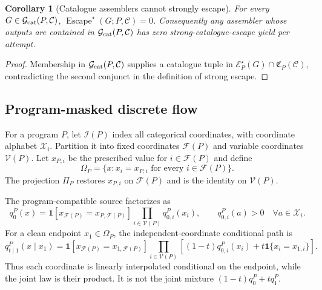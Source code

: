 \documentclass{article}
\newtheorem{corollary}[theorem]{Corollary}
\begin{document}
\begin{corollary}[Catalogue assemblers cannot strongly escape]
For every $G\in\mathcal G_{\rm cat}(P,\mathcal C)$,
$\operatorname{Escape}^\star(G;P,\mathcal C)=0$. Consequently any assembler whose outputs are
contained in $\mathcal G_{\rm cat}(P,\mathcal C)$ has zero strong-catalogue-escape yield per attempt.
\end{corollary}

\begin{proof}
Membership in $\mathcal G_{\rm cat}(P,\mathcal C)$ supplies a catalogue tuple in
$\mathcal E_P^\star(G)\cap\mathfrak C_P(\mathcal C)$, contradicting the second conjunct in the
definition of strong escape.
\end{proof}

\subsection{Program-masked discrete flow}

For a program $P$, let $\mathcal I(P)$ index all categorical coordinates, with coordinate alphabet
$\mathcal X_i$. Partition it into fixed coordinates $\mathcal F(P)$ and variable coordinates
$\mathcal V(P)$. Let $x_{P,i}$ be the prescribed value for $i\in\mathcal F(P)$ and define
\begin{equation}
 \Omega_P=\{x:x_i=x_{P,i}\text{ for every }i\in\mathcal F(P)\}.
\end{equation}
The projection $\Pi_P$ restores $x_{P,i}$ on $\mathcal F(P)$ and is the identity on
$\mathcal V(P)$.

The program-compatible source factorizes as
\begin{equation}
 q_0^P(x)=
 \mathbf 1[x_{\mathcal F(P)}=x_{P,\mathcal F(P)}]
 \prod_{i\in\mathcal V(P)}q_{0,i}^P(x_i),
 \qquad q_{0,i}^P(a)>0\quad\forall a\in\mathcal X_i.
\end{equation}
For a clean endpoint $x_1\in\Omega_P$, the independent-coordinate conditional path is
\begin{equation}
 q_{t\mid1}^P(x\mid x_1)=
 \mathbf 1[x_{\mathcal F(P)}=x_{1,\mathcal F(P)}]
 \prod_{i\in\mathcal V(P)}
 \left[(1-t)q_{0,i}^P(x_i)+t\mathbf 1\{x_i=x_{1,i}\}\right].
\end{equation}
Thus each coordinate is linearly interpolated conditional on the endpoint, while the joint law is
their product. It is not the joint mixture $(1-t)q_0^P+tq_1^P$.
\end{document}
